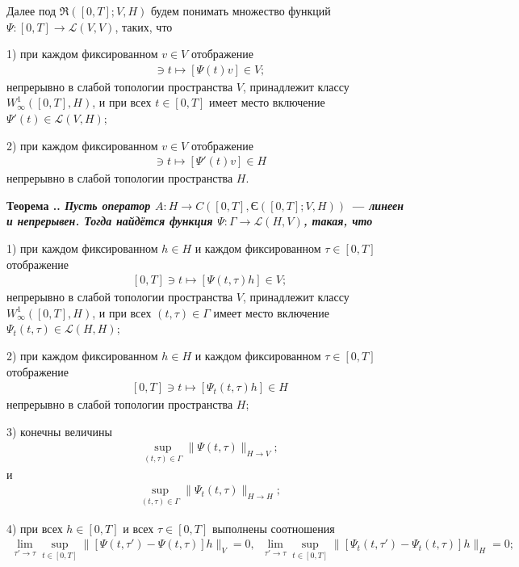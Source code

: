 \documentclass{report}
\newcounter{rem}[section]
\newcounter{theor}[section]
\renewcommand{\thetheor}{\thesection.\arabic{theor}}
\newenvironment{Theorem}{\par\refstepcounter{theor}\bf Теорема \thetheor. \it}{\rm\par}
\begin{document}
Далее под $\mathfrak{R}([0,T]; V,H)$ будем понимать множество функций $\Psi:[0,T]\to\mathcal{L}(V,V)$, таких, что

1) при каждом фиксированном $v\in V$ отображение
\begin{gather*}
[0,T]\ni t\mapsto[\Psi(t)v]\in V;
\end{gather*}
непрерывно в слабой топологии пространства $V$, принадлежит классу  $W^1_\infty([0,T],H)$,  и при всех $t\in[0,T]$ имеет место включение  $\Psi'(t)\in\mathcal{L}(V,H)$;

2) при каждом фиксированном $v\in V$ отображение
\begin{gather*}
[0,T]\ni t\mapsto[\Psi'(t)v]\in H
\end{gather*}
непрерывно в слабой топологии пространства $H$.

\begin{Theorem}\label{L.H->C([0,T],En2([0,T];V,H))!theorem}
Пусть оператор $A:H\to C([0,T],\textrm{Є}([0,T];V,H))$ --- линеен и непрерывен. Тогда найдётся функция $\Psi:\Gamma\to\mathcal{L}(H,V)$, такая, что

1)  при каждом фиксированном $h\in H$ и каждом фиксированном $\tau\in[0,T]$ отображение
\begin{gather}\label{L.H->C([0,T],En2([0,T];V,H))!t->Psi(t,tau)h}
[0,T]\ni t\mapsto[\Psi(t,\tau)h]\in V;
\end{gather}
непрерывно в слабой топологии пространства $V$, принадлежит классу  $W^1_\infty([0,T],H)$,  и при всех $(t,\tau)\in\Gamma$ имеет место включение  $\Psi_t(t,\tau)\in\mathcal{L}(H,H)$; 

2) при каждом фиксированном $h\in H$ и каждом фиксированном $\tau\in[0,T]$ отображение
\begin{gather}\label{L.H->C([0,T],En2([0,T];V,H))!t->Psi.t(t,tau)h}
[0,T]\ni t\mapsto[\Psi_t(t,\tau)h]\in H
\end{gather}
непрерывно в слабой топологии пространства $H$;

3) конечны величины
\begin{gather}\label{L.H->C([0,T],En2([0,T];V,H))!sup.wrt.(t,tau).of.norm(Psi(t,tau))}
\sup\limits_{(t,\tau)\in\Gamma}\|\Psi(t,\tau)\|_{H\to V};
\end{gather}
и
\begin{gather}\label{L.H->C([0,T],En2([0,T];V,H))!sup.wrt.(t,tau).of.norm(Psi.t(t,tau))}
\sup\limits_{(t,\tau)\in\Gamma}\|\Psi_t(t,\tau)\|_{H\to H};
\end{gather}

4) при всех $h\in[0,T]$ и всех $\tau\in[0,T]$ выполнены соотношения
\begin{gather*}
\lim\limits_{\tau'\to\tau}\sup\limits_{t\in[0,T]}\|[\Psi(t,\tau')-\Psi(t,\tau)]h\|_V=0,\,\,\,
\lim\limits_{\tau'\to\tau}\sup\limits_{t\in[0,T]}\|[\Psi_t(t,\tau')-\Psi_t(t,\tau)]h\|_H=0;
\end{gather*}


\end{Theorem}
\end{document}
